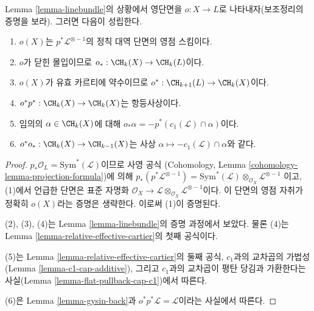 \begin{lemma}
\label{lemma-linebundle-formulae}
Lemma \ref{lemma-linebundle}의 상황에서 영단면을 $o : X \to L$로
나타내자(보조정리의 증명을 보라). 그러면 다음이 성립한다.
\begin{enumerate}
\item $o(X)$는 $p^*\mathcal{L}^{\otimes -1}$의 정칙 대역 단면의 영점
스킴이다.
\item $o$가 닫힌 몰입이므로 $o_* : \CH_k(X) \to \CH_k(L)$이다.
\item $o(X)$가 유효 카르티에 약수이므로
$o^* : \CH_{k + 1}(L) \to \CH_k(X)$이다.
\item $o^* p^* : \CH_k(X) \to \CH_k(X)$는 항등사상이다.
\item 임의의 $\alpha \in \CH_k(X)$에 대해
$o_*\alpha = - p^*(c_1(\mathcal{L}) \cap \alpha)$이다.
\item $o^* o_* : \CH_k(X) \to \CH_{k - 1}(X)$는 사상
$\alpha \mapsto - c_1(\mathcal{L}) \cap \alpha$와 같다.
\end{enumerate}
\end{lemma}

\begin{proof}
$p_*\mathcal{O}_L = \text{Sym}^*(\mathcal{L})$이므로 사영 공식
(Cohomology, Lemma \ref{cohomology-lemma-projection-formula})에 의해
$p_*(p^*\mathcal{L}^{\otimes -1}) =
\text{Sym}^*(\mathcal{L}) \otimes_{\mathcal{O}_X} \mathcal{L}^{\otimes -1}$
이고, (1)에서 언급한 단면은 표준 자명화
$\mathcal{O}_X \to
\mathcal{L} \otimes_{\mathcal{O}_X} \mathcal{L}^{\otimes -1}$이다.
이 단면의 영점 자취가 정확히 $o(X)$라는 증명은 생략한다. 이로써
(1)이 증명된다.

\medskip\noindent
(2), (3), (4)는 Lemma \ref{lemma-linebundle}의 증명 과정에서 보았다.
물론 (4)는 Lemma \ref{lemma-relative-effective-cartier}의 첫째 공식이다.

\medskip\noindent
(5)는 Lemma \ref{lemma-relative-effective-cartier}의 둘째 공식,
$c_1$과의 교차곱의 가법성(Lemma \ref{lemma-c1-cap-additive}), 그리고
$c_1$과의 교차곱이 평탄 당김과 가환한다는 사실(Lemma
\ref{lemma-flat-pullback-cap-c1})에서 따른다.

\medskip\noindent
(6)은 Lemma \ref{lemma-gysin-back}과
$o^*p^*\mathcal{L} = \mathcal{L}$이라는 사실에서 따른다.
\end{proof}

